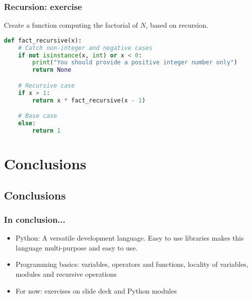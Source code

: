 

\begin{frame}[fragile]
 \frametitle{Recursion: exercise}
 Create a function computing the factorial of $N$, based on recursion. \pause
 \begin{lstlisting}[language=Python]
def fact_recursive(x):
    # Catch non-integer and negative cases
    if not isinstance(x, int) or x < 0:
        print("You should provide a positive integer number only")
        return None

    # Recursive case
    if x > 1:
        return x * fact_recursive(x - 1)

    # Base case
    else:
        return 1
 \end{lstlisting}
\end{frame}

\section{Conclusions}
\subsection*{Conclusions}
\begin{frame}[fragile]
  \frametitle{In conclusion...}
  \begin{itemize}
     \item Python: A versatile development language. Easy to use libraries makes this language multi-purpose and easy to use.
     \item Programming basics: variables, operators and functions, locality of variables, modules and recursive operations
  \end{itemize}
  \pause
    \begin{itemize}
     \item For now: exercises on slide deck and Python modules
  \end{itemize}
\end{frame}

